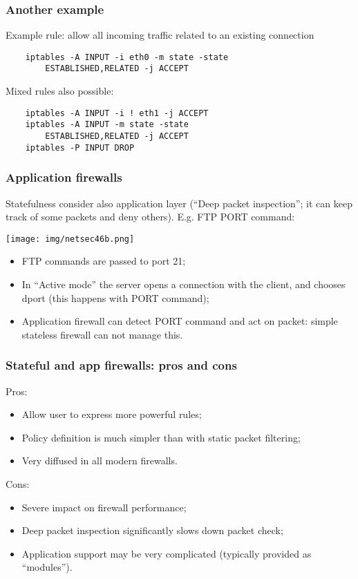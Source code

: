 \documentclass[a4paper, 10pt, titlepage]{article}
\begin{document}
\subsubsection*{Another example} %
Example rule: allow all incoming traffic related to an existing connection
\begin{lstlisting}
	iptables -A INPUT -i eth0 -m state -state
		ESTABLISHED,RELATED -j ACCEPT
\end{lstlisting}
Mixed rules also possible:
\begin{lstlisting}
	iptables -A INPUT -i ! eth1 -j ACCEPT
	iptables -A INPUT -m state -state
		ESTABLISHED,RELATED -j ACCEPT
	iptables -P INPUT DROP
\end{lstlisting}

\subsubsection*{Application firewalls}
Statefulness consider also application layer (“Deep packet inspection”; it can keep track of some packets and deny others). E.g. FTP PORT command:\medskip\\
\begin{minipage}{0.4\textwidth} 
\begin{center}
	\texttt{[image: img/netsec46b.png]}
\end{center}
\end{minipage}
\hfill 
\begin{minipage}{0.55\textwidth}
	\begin{itemize}
		\item FTP commands are passed to port 21;
		\item In “Active mode” the server opens a connection with the client, and chooses dport (this happens with PORT command);
		\item Application firewall can detect PORT command and act on packet: simple stateless firewall can not manage this.
	\end{itemize}
\end{minipage}

\subsubsection*{Stateful and app firewalls: pros and cons}
Pros:
\begin{itemize}
	\item Allow user to express more powerful rules;
	\item Policy definition is much simpler than with static packet filtering;
	\item Very diffused in all modern firewalls.
\end{itemize}
Cons:
\begin{itemize}
	\item Severe impact on firewall performance;
	\item Deep packet inspection significantly slows down packet check;
	\item Application support may be very complicated (typically provided as “modules”).
\end{itemize}
\end{document}
